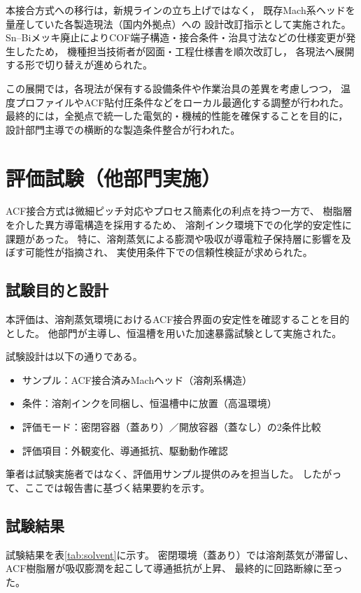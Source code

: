 \documentclass[conference]{IEEEtran}
\begin{document}
本接合方式への移行は，新規ラインの立ち上げではなく，
既存Mach系ヘッドを量産していた各製造現法（国内外拠点）への
設計改訂指示として実施された。  
Sn–Biメッキ廃止によりCOF端子構造・接合条件・治具寸法などの仕様変更が発生したため，
機種担当技術者が図面・工程仕様書を順次改訂し，
各現法へ展開する形で切り替えが進められた。  

この展開では，各現法が保有する設備条件や作業治具の差異を考慮しつつ，
温度プロファイルやACF貼付圧条件などをローカル最適化する調整が行われた。  
最終的には，全拠点で統一した電気的・機械的性能を確保することを目的に，
設計部門主導での横断的な製造条件整合が行われた。  

\section{評価試験（他部門実施）}

ACF接合方式は微細ピッチ対応やプロセス簡素化の利点を持つ一方で、  
樹脂層を介した異方導電構造を採用するため、  
溶剤インク環境下での化学的安定性に課題があった。  
特に、溶剤蒸気による膨潤や吸収が導電粒子保持層に影響を及ぼす可能性が指摘され、  
実使用条件下での信頼性検証が求められた。

\subsection{試験目的と設計}
本評価は、溶剤蒸気環境におけるACF接合界面の安定性を確認することを目的とした。  
他部門が主導し、恒温槽を用いた加速暴露試験として実施された。  

試験設計は以下の通りである。

\begin{itemize}
  \item サンプル：ACF接合済みMachヘッド（溶剤系構造）
  \item 条件：溶剤インクを同梱し、恒温槽中に放置（高温環境）
  \item 評価モード：密閉容器（蓋あり）／開放容器（蓋なし）の2条件比較
  \item 評価項目：外観変化、導通抵抗、駆動動作確認
\end{itemize}

筆者は試験実施者ではなく、評価用サンプル提供のみを担当した。  
したがって、ここでは報告書に基づく結果要約を示す。

\subsection{試験結果}
試験結果を表\ref{tab:solvent}に示す。  
密閉環境（蓋あり）では溶剤蒸気が滞留し、  
ACF樹脂層が吸収膨潤を起こして導通抵抗が上昇、  
最終的に回路断線に至った。  
\end{document}

